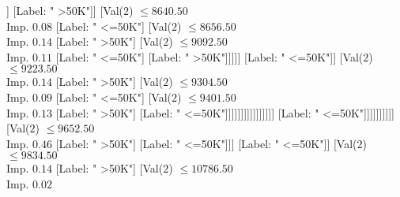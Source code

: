 \documentclass[margin=10pt]{standalone}
\begin{document}
\begin{forest}
																																																							[Val($2$) $ \leq 8541.50$ \\ Imp. $0.31$
																																																								[Val($2$) $ \leq 8537.50$ \\ Imp. $0.25$
																																																									[Label: " >50K"]
																																																									[Label: " <=50K"]]
																																																								[Label: " >50K"]]
																																																							[Val($2$) $ \leq 8640.50$ \\ Imp. $0.08$
																																																								[Label: " <=50K"]
																																																								[Val($2$) $ \leq 8656.50$ \\ Imp. $0.14$
																																																									[Label: " >50K"]
																																																									[Val($2$) $ \leq 9092.50$ \\ Imp. $0.11$
																																																										[Label: " <=50K"]
																																																										[Label: " >50K"]]]]]
																																																						[Label: " <=50K"]]
																																																					[Val($2$) $ \leq 9223.50$ \\ Imp. $0.14$
																																																						[Label: " >50K"]
																																																						[Val($2$) $ \leq 9304.50$ \\ Imp. $0.09$
																																																							[Label: " <=50K"]
																																																							[Val($2$) $ \leq 9401.50$ \\ Imp. $0.13$
																																																								[Label: " >50K"]
																																																								[Label: " <=50K"]]]]]]]]]]]]]]]]
																																									[Label: " <=50K"]]]]]]]]]]
																																[Val($2$) $ \leq 9652.50$ \\ Imp. $0.46$
																																	[Label: " >50K"]
																																	[Label: " <=50K"]]]
																															[Label: " <=50K"]]
																														[Val($2$) $ \leq 9834.50$ \\ Imp. $0.14$
																															[Label: " >50K"]
																															[Val($2$) $ \leq 10786.50$ \\ Imp. $0.02$

\end{forest}
\end{document}
